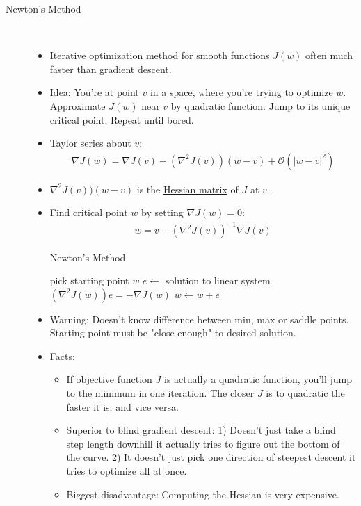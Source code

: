 \documentclass[10pt]{article}
\begin{document}
\begin{description}
	\item[Newton's Method]
	\
		\begin{itemize}
			\item Iterative optimization method for smooth functions $J(w)$ often much faster than gradient descent.
			\item Idea: You're at point $v$ in a space, where you're trying to optimize $w$. Approximate $J(w)$ near $v$ by quadratic function. Jump to its unique critical point. Repeat until bored.
			\item Taylor series about $v$:
				\begin{align*}
					\nabla J(w) = \nabla J(v) + (\nabla^{2}J(v))(w-v) + \mathcal{O}(|w - v|^{2})
				\end{align*}
			\item $\nabla^{2}J(v))(w-v)$ is the \underline{Hessian matrix} of $J$ at $v$.
			\item Find critical point $w$ by setting $\nabla J(w) = 0$:
				\begin{align*}
					w = v - (\nabla^{2}J(v))^{-1}\nabla J(v)
				\end{align*} 
				\begin{algorithm*}
					\caption{Newton's Method}
					\begin{algorithmic}
						\State pick starting point $w$
						\State $e \leftarrow$ solution to linear system $(\nabla^{2}J(w))e = -\nabla J(w)$
						\State $w \leftarrow w + e$
						\EndWhile
					\end{algorithmic}
				\end{algorithm*}
			\item Warning: Doesn't know difference between min, max or saddle points. Starting point must be "close enough" to desired solution.
			\item Facts:
				\begin{itemize}
					\item If objective function $J$ is actually a quadratic function, you'll jump to the minimum in one iteration. The closer $J$ is to quadratic the faster it is, and vice versa.
					\item Superior to blind gradient descent: 1) Doesn't just take a blind step length downhill it actually tries to figure out the bottom of the curve. 2) It doesn't just pick one direction of steepest descent it tries to optimize all at once.
					\item Biggest disadvantage: Computing the Hessian is very expensive. 
				\end{itemize}
		\end{itemize}
		

\end{description}
\end{document}
